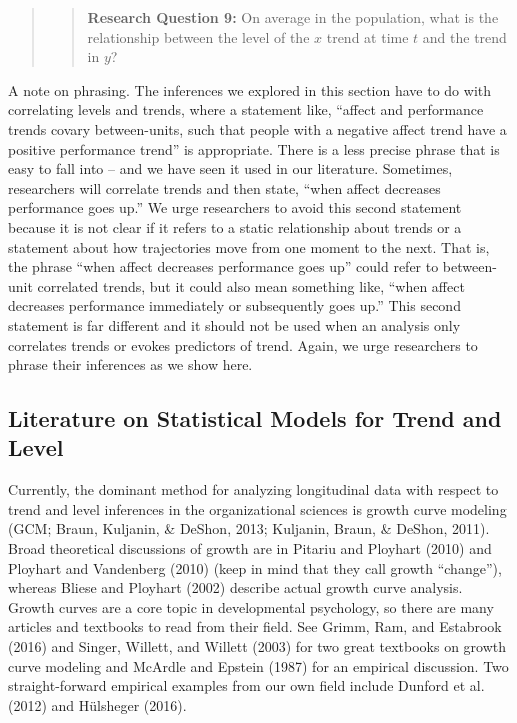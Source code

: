 \documentclass[english,,man]{apa6}
\begin{document}
\begin{quote}
\begin{quote}
\textbf{Research Question 9:} On average in the population, what is the relationship between the level of the \(x\) trend at time \(t\) and the trend in \(y\)?
\end{quote}
\end{quote}

A note on phrasing. The inferences we explored in this section have to do with correlating levels and trends, where a statement like, \enquote{affect and performance trends covary between-units, such that people with a negative affect trend have a positive performance trend} is appropriate. There is a less precise phrase that is easy to fall into -- and we have seen it used in our literature. Sometimes, researchers will correlate trends and then state, \enquote{when affect decreases performance goes up.} We urge researchers to avoid this second statement because it is not clear if it refers to a static relationship about trends or a statement about how trajectories move from one moment to the next. That is, the phrase \enquote{when affect decreases performance goes up} could refer to between-unit correlated trends, but it could also mean something like, \enquote{when affect decreases performance immediately or subsequently goes up.} This second statement is far different and it should not be used when an analysis only correlates trends or evokes predictors of trend. Again, we urge researchers to phrase their inferences as we show here.

\hypertarget{literature-on-statistical-models-for-trend-and-level}{%
\subsection{Literature on Statistical Models for Trend and Level}\label{literature-on-statistical-models-for-trend-and-level}}

Currently, the dominant method for analyzing longitudinal data with respect to trend and level inferences in the organizational sciences is growth curve modeling (GCM; Braun, Kuljanin, \& DeShon, 2013; Kuljanin, Braun, \& DeShon, 2011). Broad theoretical discussions of growth are in Pitariu and Ployhart (2010) and Ployhart and Vandenberg (2010) (keep in mind that they call growth \enquote{change}), whereas Bliese and Ployhart (2002) describe actual growth curve analysis. Growth curves are a core topic in developmental psychology, so there are many articles and textbooks to read from their field. See Grimm, Ram, and Estabrook (2016) and Singer, Willett, and Willett (2003) for two great textbooks on growth curve modeling and McArdle and Epstein (1987) for an empirical discussion. Two straight-forward empirical examples from our own field include Dunford et al. (2012) and Hülsheger (2016).
\end{document}
